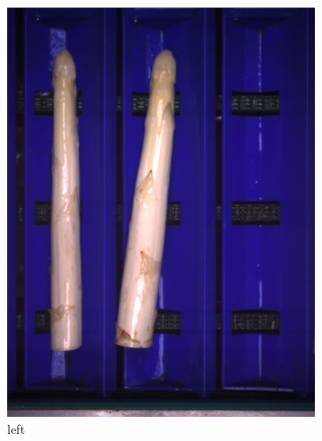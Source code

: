 \begin{figure}[!h]
	\centering
	\vspace{20pt}
	\begin{subfigure}{0.3\textwidth}
		\includegraphics[width=0.95\linewidth]{Figures/chapter02/anna_a.png}
		\caption{left}
	\end{subfigure}
	\begin{subfigure}{0.3\textwidth}

\end{subfigure}
\end{figure}

